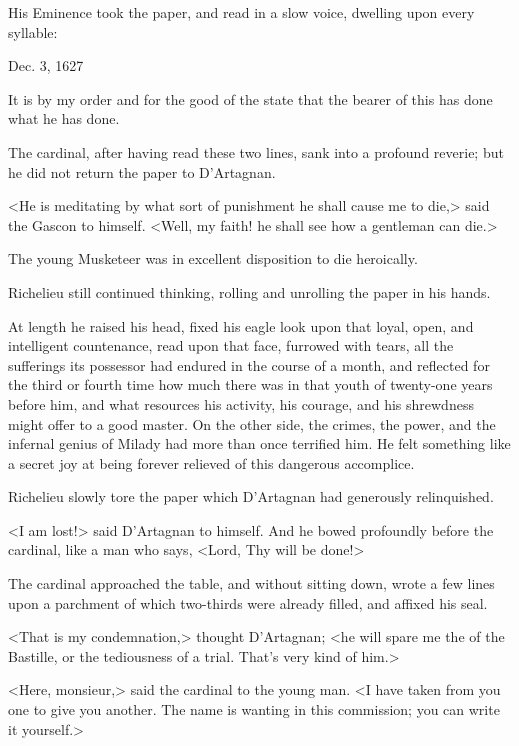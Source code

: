 His Eminence took the paper, and read in a slow voice, dwelling upon every syllable: 


\begin{mail}{Dec. 3, 1627}{}

It is by my order and for the good of the state that the bearer of this has done what he has done.

\end{mail}

The cardinal, after having read these two lines, sank into a profound reverie; but he did not return the paper to D'Artagnan. 

<He is meditating by what sort of punishment he shall cause me to die,> said the Gascon to himself. <Well, my faith! he shall see how a gentleman can die.> 

The young Musketeer was in excellent disposition to die heroically. 

Richelieu still continued thinking, rolling and unrolling the paper in his hands. 

At length he raised his head, fixed his eagle look upon that loyal, open, and intelligent countenance, read upon that face, furrowed with tears, all the sufferings its possessor had endured in the course of a month, and reflected for the third or fourth time how much there was in that youth of twenty-one years before him, and what resources his activity, his courage, and his shrewdness might offer to a good master. On the other side, the crimes, the power, and the infernal genius of Milady had more than once terrified him. He felt something like a secret joy at being forever relieved of this dangerous accomplice. 

Richelieu slowly tore the paper which D'Artagnan had generously relinquished. 

<I am lost!> said D'Artagnan to himself. And he bowed profoundly before the cardinal, like a man who says, <Lord, Thy will be done!> 

The cardinal approached the table, and without sitting down, wrote a few lines upon a parchment of which two-thirds were already filled, and affixed his seal. 

<That is my condemnation,> thought D'Artagnan; <he will spare me the  of the Bastille, or the tediousness of a trial. That's very kind of him.> 

<Here, monsieur,> said the cardinal to the young man. <I have taken from you one  to give you another. The name is wanting in this commission; you can write it yourself.> 

